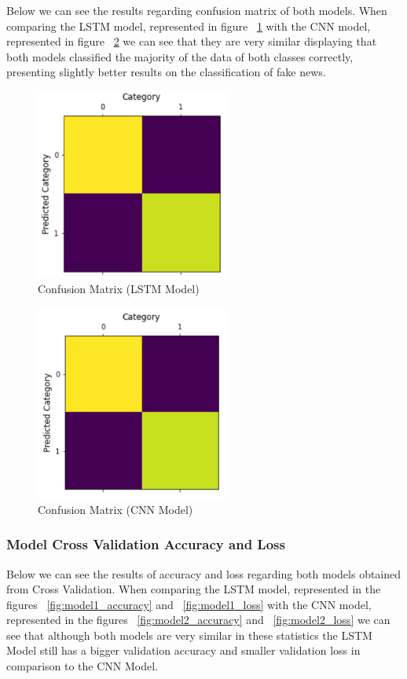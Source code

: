 \documentclass[conference]{IEEEtran}
\begin{document}
Below we can see the results regarding confusion matrix of both models.
\linebreak When comparing the LSTM model, represented in figure ~\ref{fig:model1_confmatrix} with the CNN model, represented in figure ~\ref{fig:model2_confmatrix} we can see that they are very similar displaying that both models classified the majority of the data of both classes correctly, presenting slightly better results on the classification of fake news.
\begin{figure}[H]
    \centering
    \includegraphics[width=2.5in]{pictures/model1_confmatrix.png}
    \caption{Confusion Matrix (LSTM Model)}\label{fig:model1_confmatrix}
\end{figure}

\begin{figure}[H]
    \centering
    \includegraphics[width=2.5in]{pictures/model2_confmatrix.png}
    \caption{Confusion Matrix (CNN Model)}\label{fig:model2_confmatrix}
\end{figure}

\subsubsection{Model Cross Validation Accuracy and Loss}

Below we can see the results of accuracy and loss regarding both models obtained from Cross Validation.
\linebreak When comparing the LSTM model, represented in the figures ~\ref{fig:model1_accuracy} and ~\ref{fig:model1_loss} with the CNN model, represented in the figures ~\ref{fig:model2_accuracy} and ~\ref{fig:model2_loss} we can see that although both models are very similar in these statistics the LSTM Model still has a bigger validation accuracy and smaller validation loss in comparison to the CNN Model.
\end{document}
